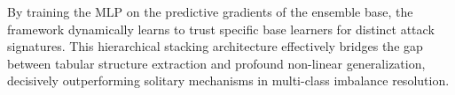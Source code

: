 By training the MLP on the predictive gradients of the ensemble base, the framework dynamically learns to trust specific base learners for distinct attack signatures. This hierarchical stacking architecture effectively bridges the gap between tabular structure extraction and profound non-linear generalization, decisively outperforming solitary mechanisms in multi-class imbalance resolution.
